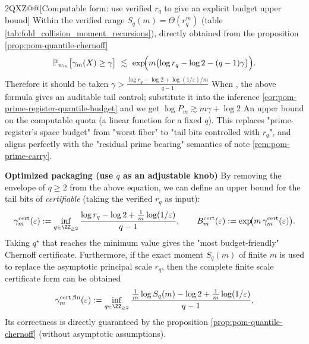 
\begin@@ZXQPH2QXZ@@[Computable form: use verified \texorpdfstring{$r_q$}{rq} to give an explicit budget upper bound]\label{rem:pom-quantile-budget-computable}
Within the verified range \(S_q(m)=\Theta(r_q^m)\) (table \ref{tab:fold_collision_moment_recursions}), directly obtained from the proposition \ref{prop:pom-quantile-chernoff}
$$
\mathbb{P}_{w_m}\big[\gamma_m(X)\ge\gamma\big]\ \lesssim\
\exp\!\Bigl(m\bigl(\log r_q-\log 2-(q-1)\gamma\bigr)\Bigr).
$$
Therefore it should be taken
\(
\gamma>\frac{\log r_q-\log 2+\log(1/\varepsilon)/m}{q-1}
\)
When , the above formula gives an auditable tail control; substitute it into the inference \ref{cor:pom-prime-register-quantile-budget} and we get
\(
\log P_m
\gtrsim
m\gamma+\log 2
\)
An upper bound on the computable quota (a linear function for a fixed \(q\)).
This replaces "prime-register's space budget" from "worst fiber" to "tail bits controlled with \(r_q\)", and aligns perfectly with the "residual prime bearing" semantics of note \ref{rem:pom-prime-carry}.

\medskip\noindent\textbf{Optimized packaging (use \(q\) as an adjustable knob)}
By removing the envelope of \(q\ge 2\) from the above equation, we can define an upper bound for the tail bits of \emph{certifiable} (taking the verified \(r_q\) as input):
\[
\gamma^{\mathrm{cert}}_m(\varepsilon)
:=\inf_{q\in\ZZ_{\ge 2}}
\frac{\log r_q-\log 2+\frac{1}{m}\log(1/\varepsilon)}{q-1},
\qquad
B^{\mathrm{cert}}_m(\varepsilon):=\exp\!\bigl(m\,\gamma^{\mathrm{cert}}_m(\varepsilon)\bigr).
\]
Taking \(q^\star\) that reaches the minimum value gives the "most budget-friendly" Chernoff certificate.
Furthermore, if the exact moment \(S_q(m)\) of finite \(m\) is used to replace the asymptotic principal scale \(r_q\), then the complete finite scale certificate form can be obtained
\[
\gamma^{\mathrm{cert,fin}}_m(\varepsilon)
:=\inf_{q\in\ZZ_{\ge 2}}
\frac{\frac{1}{m}\log S_q(m)-\log 2+\frac{1}{m}\log(1/\varepsilon)}{q-1},
\]
Its correctness is directly guaranteed by the proposition \ref{prop:pom-quantile-chernoff} (without asymptotic assumptions).

